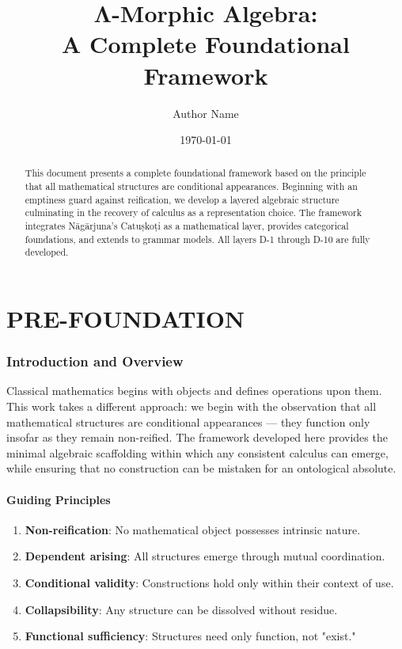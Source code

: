 \documentclass[12pt, oneside]{article}
\title{Λ-Morphic Algebra: \\ A Complete Foundational Framework}
\author{Author Name}
\date{\today}
\begin{document}
\maketitle

\begin{abstract}
This document presents a complete foundational framework based on the principle that all mathematical structures are conditional appearances. Beginning with an emptiness guard against reification, we develop a layered algebraic structure culminating in the recovery of calculus as a representation choice. The framework integrates Nāgārjuna's Catuṣkoṭi as a mathematical layer, provides categorical foundations, and extends to grammar models. All layers D-1 through D-10 are fully developed.
\end{abstract}

\tableofcontents

\newpage

\part{PRE-FOUNDATION}

\section{Introduction and Overview}

Classical mathematics begins with objects and defines operations upon them. This work takes a different approach: we begin with the observation that all mathematical structures are conditional appearances — they function only insofar as they remain non-reified. The framework developed here provides the minimal algebraic scaffolding within which any consistent calculus can emerge, while ensuring that no construction can be mistaken for an ontological absolute.

\subsection{Guiding Principles}

\begin{enumerate}
    \item \textbf{Non-reification}: No mathematical object possesses intrinsic nature.
    \item \textbf{Dependent arising}: All structures emerge through mutual coordination.
    \item \textbf{Conditional validity}: Constructions hold only within their context of use.
    \item \textbf{Collapsibility}: Any structure can be dissolved without residue.
    \item \textbf{Functional sufficiency}: Structures need only function, not "exist."
\end{enumerate}
\end{document}
